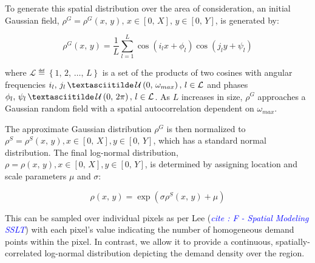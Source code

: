 \documentclass[onecolumn,draftcls]{IEEEtran}
\begin{document}
To generate this spatial distribution over the area of consideration, an initial Gaussian field, $\rho^G = \rho^G\left(x,\, y\right),\, x \in \left[0,\, X\right],\, y \in \left[0,\, Y\right]$, is generated by:

\begin{equation}
\rho^G\left(x,\, y\right)=\frac{1}{L}\sum_{l=1}^L \cos\left(i_lx+\phi_l\right) \cos\left(j_ly+\psi_l\right)
\end{equation}

\noindent \sloppy where $\mathcal{L} \eqdef \left\{1,\, 2,\, \ldots,\, L\right\}$ is a set of the products of two cosines with angular frequencies $i_l,\, j_l\, \textasciitilde\, \mathcal{U}\left(0,\, \omega_{max}\right),\, l \in \mathcal{L}$ and phases $\phi_l,\, \psi_l\, \textasciitilde\, \mathcal{U}\left(0,\, 2\pi\right),\, l \in \mathcal{L}$.  As $L$ increases in size, $\rho^G$ approaches a Gaussian random field with a spatial autocorrelation dependent on $\omega_{max}$.

The approximate Gaussian distribution $\rho^G$ is then normalized to $\rho^S = \rho^S(x,\, y), x \in [0,\, X], y \in [0,\, Y]$, which has a standard normal distribution.  The final log-normal distribution, $\rho = \rho(x,\, y), x \in [0,\, X], y \in [0,\, Y]$, is determined by assigning location and scale parameters $\mu$ and $\sigma$:

\begin{equation}
\rho\left(x,\, y\right) = \exp\left(\sigma\rho^S\left(x,\, y\right)+\mu\right)
\end{equation}

This can be sampled over individual pixels as per Lee (\textit{\textcolor{blue}{cite : F - Spatial Modeling SSLT}}) with each pixel's value indicating the number of homogeneous demand points within the pixel.  In contrast, we allow it to provide a continuous, spatially-correlated log-normal distribution depicting the demand density over the region.

\end{document}
